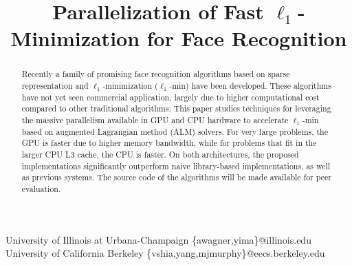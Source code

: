 \documentclass[preprint]{sigplanconf}
\begin{document}
\copyrightdata{[to be supplied]} 


\title{Parallelization of Fast $\ell_1$-Minimization for Face Recognition}

			{University of Illinois at Urbana-Champaign}
			{\{awagner,yima\}@illinois.edu}
			{University of California Berkeley}
			{\{vshia,yang,mjmurphy\}@eecs.berkeley.edu}

\maketitle

\begin{abstract} Recently a family of promising face recognition algorithms
based on sparse representation and $\ell_1$-minimization ($\ell_1$-min) have been
developed.  These algorithms have not yet seen commercial application, 
largely due to higher computational cost compared to other traditional
algorithms. This paper studies techniques for leveraging the 
massive parallelism available in GPU and CPU hardware to accelerate
$\ell_1$-min based on augmented Lagrangian method (ALM) solvers. 
For very large problems, the GPU is faster due to higher memory bandwidth, while 
for problems that fit in the larger CPU L3 cache, the CPU is faster.
On both architectures, the proposed implementations significantly outperform
naive library-based implementations, as well as previous systems. 
The source code of the
algorithms will be made available for peer evaluation.  \end{abstract}
\vspace{-0.1in}
\end{document}
